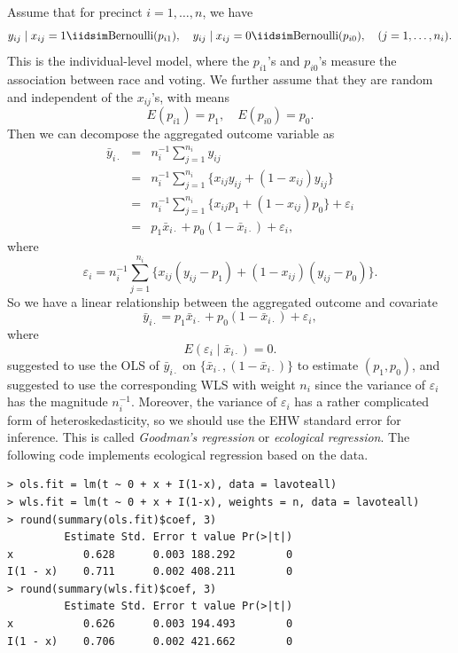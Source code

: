 Assume that for precinct $i = 1,\ldots, n$, we have
$$
y_{ij} \mid x_{ij} = 1 \iidsim \text{Bernoulli}(p_{i1}),\quad
y_{ij} \mid x_{ij} = 0 \iidsim \text{Bernoulli}(p_{i0}),\quad 
(j = 1, \ldots, n_i) . 
$$
This is the individual-level model, where the $p_{i1}$'s and $p_{i0}$'s measure the association between race and voting.
We further assume that they are random and independent of the $x_{ij}$'s, with means
\begin{equation}\label{eq::ecological-assumption-1}
E( p_{i1} ) = p_1,\quad
E( p_{i0} ) = p_0.
\end{equation}
Then we can decompose the aggregated outcome variable as 
\begin{eqnarray*}
\bar{y}_{i\cdot} &=&  n_i^{-1} \sum_{j=1}^{n_i}  y_{ij}  \\
&=&n_i^{-1} \sum_{j=1}^{n_i}   \{  x_{ij}  y_{ij}  + (1-x_{ij}) y_{ij}  \} \\
&=& n_i^{-1} \sum_{j=1}^{n_i}   \{  x_{ij}  p_{1}  + (1-x_{ij}) p_0  \}  + \varepsilon_i  \\
&=&  p_1 \bar{x}_{i\cdot}   + p_0 (1 -\bar{x}_{i\cdot} ) + \varepsilon_i,
\end{eqnarray*} 
where
$$
\varepsilon_i = n_i^{-1} \sum_{j=1}^{n_i}   \{  x_{ij}  (y_{ij} - p_{1} )   + (1-x_{ij}) ( y_{ij} -  p_0 ) \}.
$$
So we have a linear relationship between the aggregated outcome and covariate
$$
\bar{y}_{i\cdot}  = p_1 \bar{x}_{i\cdot}   + p_0 (1 -\bar{x}_{i\cdot} ) + \varepsilon_i,
$$
where 
$$
E(\varepsilon_i  \mid \bar{x}_{i\cdot}  ) = 0.
$$
\citet{goodman1953ecological} suggested to use the OLS of $\bar{y}_{i\cdot} $ on $\{ \bar{x}_{i\cdot}, (1 -\bar{x}_{i\cdot} )\}$ to estimate $(p_1, p_0)$, and \citet{goodman1959some} suggested to use the corresponding WLS with weight $n_i$ since the variance of $\varepsilon_i$ has the magnitude $n_i^{-1}$. Moreover, the variance of $\varepsilon_i$ has a rather complicated form of heteroskedasticity, so we should use the EHW standard error for inference. This is called {\it Goodman's regression} or {\it ecological regression}. The following  code implements ecological regression based on the  data. 



\begin{lstlisting}
> ols.fit = lm(t ~ 0 + x + I(1-x), data = lavoteall)
> wls.fit = lm(t ~ 0 + x + I(1-x), weights = n, data = lavoteall)
> round(summary(ols.fit)$coef, 3)
         Estimate Std. Error t value Pr(>|t|)
x           0.628      0.003 188.292        0
I(1 - x)    0.711      0.002 408.211        0
> round(summary(wls.fit)$coef, 3)
         Estimate Std. Error t value Pr(>|t|)
x           0.626      0.003 194.493        0
I(1 - x)    0.706      0.002 421.662        0
\end{lstlisting}


